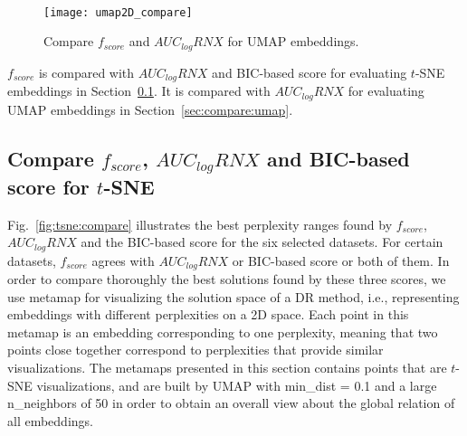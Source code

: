 ~
\begin{figure}[ht!]
    \centering
    \texttt{[image: umap2D\_compare]}
    \caption{Compare $f_{score}$ and $AUC_{log}RNX$ for UMAP embeddings.}
    \label{fig:score:umap2D:compare}
\end{figure}


$f_{score}$ is compared with $AUC_{log}RNX$ and BIC-based score for evaluating $t$-SNE embeddings in Section~\ref{sec:compare:tnse}.
It is compared with $AUC_{log}RNX$ for evaluating UMAP embeddings in Section~\ref{sec:compare:umap}.

\subsection{Compare $f_{score}$, $AUC_{log}RNX$ and BIC-based score for $t$-SNE}\label{sec:compare:tnse}

Fig.~\ref{fig:tsne:compare} illustrates the best perplexity ranges found by $f_{score}$, $AUC_{log}RNX$ and the BIC-based score for the six selected datasets.
For certain datasets, $f_{score}$ agrees with $AUC_{log}RNX$ or BIC-based score or both of them.
In order to compare thoroughly the best solutions found by these three scores, we use
metamap for visualizing the solution space of a DR method, i.e., representing embeddings with different perplexities on a 2D space.
Each point in this metamap is an embedding corresponding to one perplexity, meaning that two points close together correspond to perplexities that provide similar visualizations.
The metamaps presented in this section contains points that are $t$-SNE visualizations, and are built by UMAP with {min\_dist} = 0.1 and a large {n\_neighbors} of 50 in order to obtain an overall view about the global relation of all embeddings.


